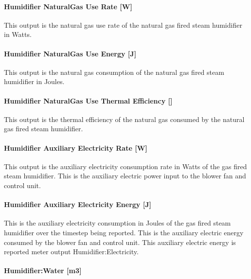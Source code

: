 \paragraph{Humidifier NaturalGas Use Rate {[}W{]}}\label{humidifier-naturalgas-use-rate-w}

This output is the natural gas use rate of the natural gas fired steam humidifier in Watts.

\paragraph{Humidifier NaturalGas Use Energy {[}J{]}}\label{humidifier-naturalgas-use-energy-j}

This output is the natural gas consumption of the natural gas fired steam humidifier in Joules.

\paragraph{Humidifier NaturalGas Use Thermal Efficiency {[}{]}}\label{humidifier-naturalgas-use-thermal-efficiency-j}

This output is the thermal efficiency of the natural gas consumed by the natural gas fired steam humidifier.

\paragraph{Humidifier Auxiliary Electricity Rate {[}W{]}}\label{humidifier-auxiliary-electric-power-w}

This output is the auxiliary electricity consumption rate in Watts of the gas fired steam humidifier. This is the auxiliary electric power input to the blower fan and control unit.

\paragraph{Humidifier Auxiliary Electricity Energy {[}J{]}}\label{humidifier-auxiliary-electric-energy-j}

This is the auxiliary electricity consumption in Joules of the gas fired steam humidifier over the timestep being reported. This is the auxiliary electric energy consumed by the blower fan and control unit. This auxiliary electric energy is reported meter output Humidifier:Electricity.

\paragraph{Humidifier:Water {[}m3{]}}\label{humidifierwater-m3-1}

